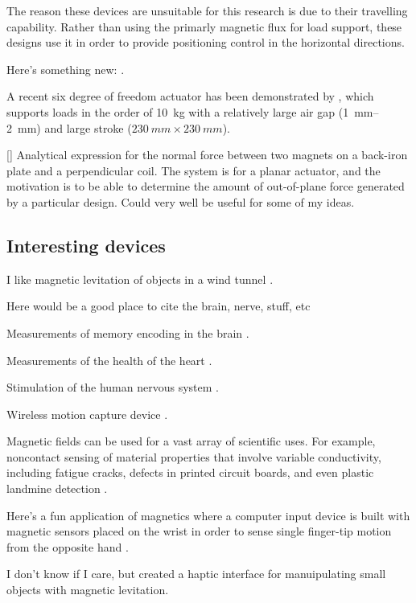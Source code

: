 The reason these devices are unsuitable for this research is due to their travelling capability.
Rather than using the primarly magnetic flux for load support, these designs use it in order to provide positioning control in the horizontal directions.

Here's something new: \textcite{shameli2008}.

A recent six degree of freedom actuator has been demonstrated by \textcite{jansen2008}, which supports loads in the order of \SI{10}{kg} with a relatively large air gap (\SI{1}{mm}--\SI{2}{mm}) and large stroke ($\SI{230}{mm}\times\SI{230}{mm}$).

[\textcite{dasilveira2005}] Analytical expression for the normal force between two magnets on a back-iron plate and a perpendicular coil.
The system is for a planar actuator, and the motivation is to be able to determine the amount of out-of-plane force generated by a particular design.
Could very well be useful for some of my ideas.

\subsection{Interesting devices}


I like magnetic levitation of objects in a wind tunnel \cite{higuchi2008}.

Here would be a good place to cite the brain, nerve, stuff, etc
\parencite{sekino2005,lu2008,demachi2008}

Measurements of memory encoding in the brain \cite{gjini2005}.

Measurements of the health of the heart \cite{lim2009}.

Stimulation of the human nervous system \cite{darabant2009}.

Wireless motion capture device \cite{hashi2005}.

Magnetic fields can be used for a vast array of scientific uses.
For example, noncontact sensing of material properties that involve variable conductivity, including fatigue cracks, defects in printed circuit boards, and even plastic landmine detection \cite{mukhopadhyay2005}.

Here's a fun application of magnetics where a computer input device is built with magnetic sensors placed on the wrist in order to sense single finger-tip motion from the opposite hand \parencite{han2008}.

I don't know if I care, but \textcite{vanwest2007} created a haptic interface for manuipulating small objects with magnetic levitation.


